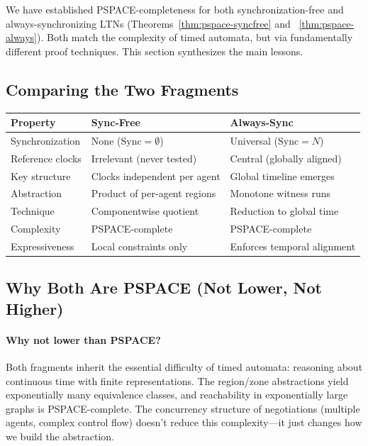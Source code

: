 We have established PSPACE-completeness for both synchronization-free and always-synchronizing LTNs (Theorems~\ref{thm:pspace-syncfree} and ~\ref{thm:pspace-always}). Both match the complexity of timed automata, but via fundamentally different proof techniques. This section synthesizes the main lessons.

\subsection{Comparing the Two Fragments}

\begin{center}
\begin{tabular}{|l|p{5cm}|p{5cm}|}
\hline
\textbf{Property} & \textbf{Sync-Free} & \textbf{Always-Sync} \\
\hline
Synchronization & None ($\text{Sync} = \emptyset$) & Universal ($\text{Sync} = N$) \\
\hline
Reference clocks & Irrelevant (never tested) & Central (globally aligned) \\
\hline
Key structure & Clocks independent per agent & Global timeline emerges \\
\hline
Abstraction & Product of per-agent regions & Monotone witness runs \\
\hline
Technique & Componentwise quotient & Reduction to global time \\
\hline
Complexity & PSPACE-complete & PSPACE-complete \\
\hline
Expressiveness & Local constraints only & Enforces temporal alignment \\
\hline
\end{tabular}
\end{center}

\subsection{Why Both Are PSPACE (Not Lower, Not Higher)}

\paragraph{Why not lower than PSPACE?} Both fragments inherit the essential difficulty of timed automata: reasoning about continuous time with finite representations. The region/zone abstractions yield exponentially many equivalence classes, and reachability in exponentially large graphs is PSPACE-complete. The concurrency structure of negotiations (multiple agents, complex control flow) doesn't reduce this complexity—it just changes how we build the abstraction.

